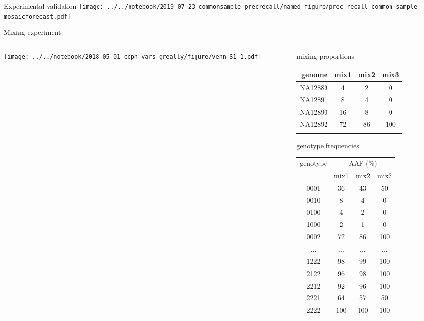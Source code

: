 \documentclass{beamer}
\begin{document}
\begin{frame}{Experimental validation}
\texttt{[image: ../../notebook/2019-07-23-commonsample-precrecall/named-figure/prec-recall-common-sample-mosaicforecast.pdf]}
\end{frame}

\begin{frame}{Mixing experiment}
\begin{columns}[t]
\begin{column}{0.5\textwidth}

\texttt{[image: ../../notebook/2018-05-01-ceph-vars-greally/figure/venn-S1-1.pdf]}
\end{column}

\begin{column}{0.5\textwidth}

{\tiny
{\large mixing proportions}

\begin{tabular}{r|ccc}
genome & mix1 & mix2 & mix3 \\
\hline
NA12889 & 4 & 2 & 0 \\
NA12891 & 8 & 4 & 0 \\
NA12890 & 16 & 8 & 0 \\
NA12892 & 72 & 86 & 100 \\
& & & \\
\end{tabular}
\vfill
{\large genotype frequencies}

\begin{tabular}{c|ccc}
genotype & \multicolumn{3}{c}{AAF (\%)} \\
& mix1 &  mix2 & mix3 \\
\hline
0001 & 36 & 43 & 50\\
0010 & 8 & 4 & 0\\
0100 & 4 & 2 & 0\\
1000 & 2 & 1 & 0\\
0002 & 72 & 86 & 100\\
... & ... & ... & ...\\
1222 & 98 & 99 & 100\\
2122 & 96 & 98 & 100\\
2212 & 92 & 96 & 100\\
2221 & 64 & 57 & 50\\
2222 & 100 & 100 & 100\\
\end{tabular}
}
\end{column}
\end{columns}
\end{frame}
\end{document}

